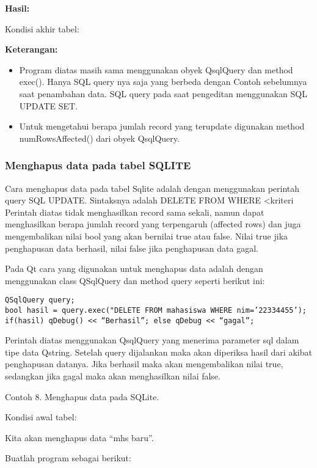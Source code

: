 \textbf{Hasil:}

Kondisi akhir tabel:

\textbf{Keterangan:}

\begin{itemize}
\tightlist
\item
  Program diatas masih sama menggunakan obyek QsqlQuery dan method
  exec(). Hanya SQL query nya saja yang berbeda dengan Contoh sebelumnya
  saat penambahan data. SQL query pada saat pengeditan menggunakan SQL
  UPDATE SET.
\item
  Untuk mengetahui berapa jumlah record yang terupdate digunakan method
  numRowsAffected() dari obyek QsqlQuery.
\end{itemize}

\subsubsection{Menghapus data pada tabel
SQLITE}\label{menghapus-data-pada-tabel-sqlite}

Cara menghapus data pada tabel Sqlite adalah dengan menggunakan perintah
query SQL UPDATE. Sintaksnya adalah DELETE FROM WHERE \textless{}kriteri
Perintah diatas tidak menghasilkan record sama sekali, namun dapat
menghasilkan berapa jumlah record yang terpengaruh (affected rows) dan
juga mengembalikan nilai bool yang akan bernilai true atau false. Nilai
true jika penghapusan data berhasil, nilai false jika penghapusan data
gagal.

Pada Qt cara yang digunakan untuk menghapus data adalah dengan
menggunakan class QSqlQuery dan method query seperti berikut ini:

\begin{verbatim}
QSqlQuery query;
bool hasil = query.exec("DELETE FROM mahasiswa WHERE nim=’22334455’);
if(hasil) qDebug() << “Berhasil”; else qDebug << “gagal”;
\end{verbatim}

Perintah diatas menggunakan QsqlQuery yang menerima parameter sql dalam
tipe data Qstring. Setelah query dijalankan maka akan diperiksa hasil
dari akibat penghapusan datanya. Jika berhasil maka akan mengembalikan
nilai true, sedangkan jika gagal maka akan menghasilkan nilai false.

Contoh 8. Menghapus data pada SQLite.

Kondisi awal tabel:

Kita akan menghapus data ``mhs baru''.

Buatlah program sebagai berikut:

